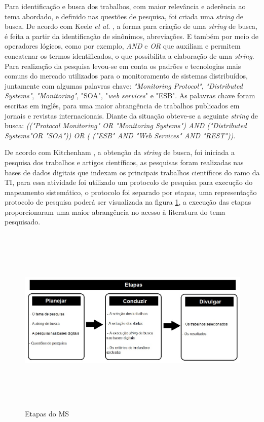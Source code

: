 Para identificação e busca dos trabalhos, com maior relevância e aderência ao tema abordado, e definido nas questões de pesquisa, foi criada uma \textit{string} de busca. De acordo com Keele \textit{et al.} \cite{keele2007guidelines}, a forma para criação de uma \textit{string} de busca, é feita a partir da identificação de sinônimos, abreviações. E também por meio de operadores lógicos, como por exemplo, \textit{AND} e \textit{OR} que auxiliam e permitem concatenar os termos identificados, o que possibilita a elaboração de uma \textit{string}. Para realização da pesquisa levou-se em conta os padrões e tecnologias mais comuns do mercado utilizados para o monitoramento de sistemas distribuídos, juntamente com algumas palavras chave: \textit{"Monitoring Protocol"}, \textit{"Distributed Systems"}, \textit{"Monitoring"}, "\acrshort{SOA}", "\textit{web services}" e "\acrshort{ESB}". As palavras chave foram escritas em inglês, para uma maior abrangência de trabalhos publicados em jornais e revistas internacionais. Diante da situação obteve-se a seguinte \textit{string} de busca: \textit{(("Protocol Monitoring" OR "Monitoring Systems") AND ("Distributed Systems"OR "SOA")) OR ( ("ESB" AND "Web Services" AND "REST"))}.

De acordo com Kitchenham \cite{kitchenham2007guidelines}, a obtenção da \textit{string} de busca, foi iniciada a pesquisa dos trabalhos e artigos científicos, as pesquisas foram realizadas nas bases de dados digitais que indexam os principais trabalhos científicos do ramo da \acrlong{TI}, para essa atividade foi utilizado um protocolo de pesquisa para execução do mapeamento sistemático, o protocolo foi separado por etapas, uma representação protocolo de pesquisa poderá ser visualizada na figura \ref{fig:etapasRSL}, a execução das etapas proporcionaram uma maior abrangência no acesso à literatura do tema pesquisado.

\begin{figure}[!ht]
\centering
\includegraphics[width = 16cm, height=9cm]{img/etapas_RSL_final.jpg}
\caption{Etapas do \acrlong{MS}}
\label{fig:etapasRSL}
\end{figure}

